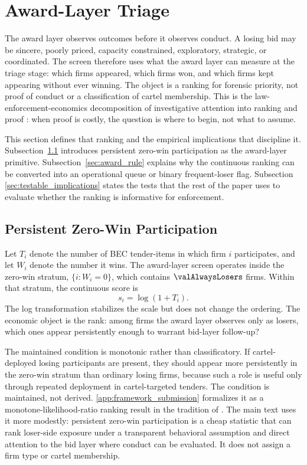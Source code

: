 \section{Award-Layer Triage}
\label{sec:award_screen}

The award layer observes outcomes before it observes conduct. A
losing bid may be sincere, poorly priced, capacity constrained,
exploratory, strategic, or coordinated. The screen therefore
uses what the award layer can measure at the triage stage: which
firms appeared, which firms won, and which firms kept appearing
without ever winning. The object is a ranking for forensic
priority, not proof of conduct or a classification of cartel
membership. This is the law-enforcement-economics decomposition
of investigative attention into ranking and proof
\citep{becker1968crime,stigler1970optimum}: when proof is costly,
the question is where to begin, not what to assume.

This section defines that ranking and the empirical implications
that discipline it. Subsection~\ref{sec:award_primitive}
introduces persistent zero-win participation as the award-layer
primitive. Subsection~\ref{sec:award_rule} explains why the
continuous ranking can be converted into an operational queue or
binary frequent-loser flag. Subsection
\ref{sec:testable_implications} states the tests that the rest
of the paper uses to evaluate whether the ranking is informative
for enforcement.

\subsection{Persistent Zero-Win Participation}
\label{sec:award_primitive}

Let $T_i$ denote the number of BEC tender-items in which firm
$i$ participates, and let $W_i$ denote the number it wins. The
award-layer screen operates inside the zero-win stratum,
$\{i:W_i=0\}$, which contains $\valAlwaysLosers$ firms. Within
that stratum, the continuous score is
\[
  s_i=\log(1+T_i).
\]
The log transformation stabilizes the scale but does not change
the ordering. The economic object is the rank: among firms the
award layer observes only as losers, which ones appear
persistently enough to warrant bid-layer follow-up?

The maintained condition is monotonic rather than classificatory.
If cartel-deployed losing participants are present, they should
appear more persistently in the zero-win stratum than ordinary
losing firms, because such a role is useful only through repeated
deployment in cartel-targeted tenders. The condition is
maintained, not derived. \ref{app:framework_submission}
formalizes it as a monotone-likelihood-ratio ranking result in
the tradition of \citet{karlin1956mlr}. The
main text uses it more modestly: persistent zero-win participation
is a cheap statistic that can rank loser-side exposure under a
transparent behavioral assumption and direct attention to the bid
layer where conduct can be evaluated. It does not assign a firm
type or cartel membership.


